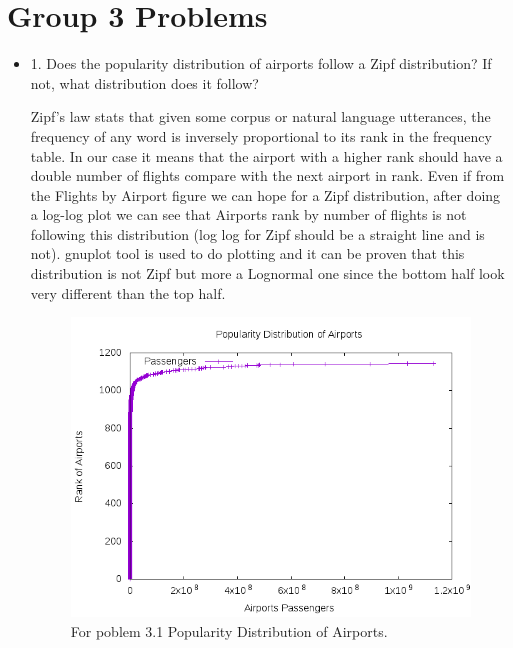 \documentclass[fontsize=11pt,paper=a4]{scrartcl}
\begin{document}
\section{Group 3 Problems}
\begin{itemize}
\item 1. Does the popularity distribution of airports follow a Zipf distribution? If not, what distribution does it follow?

Zipf’s law stats that given some corpus or natural language utterances, the frequency of any word is inversely proportional to its rank in the frequency table. In our case it means that the airport with a higher rank should have a double number of flights compare with the next airport in rank. Even if from the Flights by Airport figure we can hope for a Zipf distribution, after
doing a log-log plot we can see that Airports rank by number of flights is not following this distribution (log log for Zipf should be a straight line and is not). gnuplot tool is used to do plotting and it can be proven that this distribution is not Zipf but more a Lognormal one since the bottom half look very different than the top half. 

\begin{figure}
\centering
\includegraphics[totalheight=8cm]{airport_rank.png}
\caption{For poblem 3.1 Popularity Distribution of Airports.}
\label{fig:verticalcell}
\end{figure}


\end{itemize}
\end{document}
